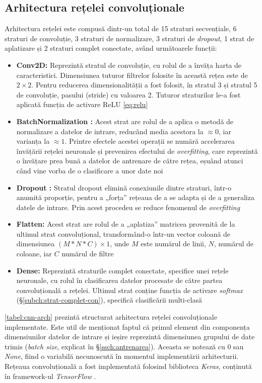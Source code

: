 \subsection{Arhitectura rețelei convoluționale}
Arhitectura rețelei este compusă dintr-un total de 15 straturi secvențiale, 6 straturi de convoluție, 3 straturi de normalizare, 3 straturi de \textit{dropout}, 1 strat de aplatizare și 2 straturi complet conectate, având următoarele funcții:
\begin{itemize}
\item \textbf{Conv2D:} Reprezintă stratul de convoluție, cu rolul de a învăța harta de caracteristici. Dimensiunea tuturor filtrelor folosite în această rețea este de $2\times2$. Pentru reducerea dimensionalității a fost folosit, în stratul 3 și stratul 5 de convoluție, pasului (stride) cu valoarea 2. Tuturor straturilor le-a fost aplicată funcția de activare ReLU \eqref{eq:relu}
\item \textbf{BatchNormalization \textnormal{\cite{ioffe2015batch}}:} Acest strat are rolul de a aplica o metodă de normalizare a datelor de intrare, reducând media acestora la $\approx0$, iar varianța la $\approx1$. Printre efectele acestei operații se numără accelerarea învățării rețelei neuronale și prevenirea efectului de \textit{overfitting}, care reprezintă o învățare prea bună a datelor de antrenare de către rețea, eșuând atunci când vine vorba de o clasificare a unor date noi
\item \textbf{Dropout \textnormal{\cite{hinton2012improving-dropout}}:} Stratul dropout elimină conexiunile dintre straturi, într-o anumită proporție, pentru a „forța” rețeaua de a se adapta și de a generaliza datele de intrare. Prin acest procedeu se reduce fenomenul de \textit{overfitting}
\item \textbf{Flatten:} Acest strat are rolul de a „aplatiza” matricea provenită de la ultimul strat convoluțional, transformând-o într-un vector coloană de dimensiunea $(M*N*C)\times1$, unde $M$ este numărul de linii, $N$, numărul de coloane, iar $C$ numărul de filtre
\item \textbf{Dense:} Reprezintă straturile complet conectate, specifice unei rețele neuronale, cu rolul în clasificarea datelor procesate de către partea convoluțională a rețelei. Ultimul strat conține funcția de activare \textit{softmax} (\S\ref{subch:strat-complet-con}), specifică clasificării multi-clasă
\end{itemize}

\autoref{tabel:cnn-arch} prezintă structurat arhitectura rețelei convoluționale implementate. Este util de menționat faptul că primul element din componența dimensiunilor datelor de intrare și ieșire reprezintă dimensiunea grupului de date trimis (\textit{batch size}, explicat în \S\ref{ssch:antrenarea}). Aceasta se notează cu 0 sau \textit{None}, fiind o variabilă necunoscută în momentul implementării arhitecturii. Rețeaua convoluțională a fost implementată folosind biblioteca \textit{Keras}, conținută în framework-ul \textit{TensorFlow} \cite{online:tf-keras}.

